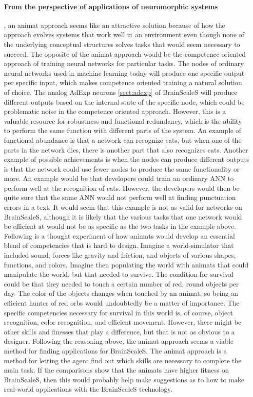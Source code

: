 \paragraph{From the perspective of applications of neuromorphic systems}, an animat approach seems like an attractive solution because of how the approach evolves systems that work well in an environment even though none of the underlying conceptual structures solves tasks that would seem necessary to succeed.
The opposite of the animat approach would be the competence oriented approach of training neural networks for particular tasks.
The nodes of ordinary neural networks used in machine learning today will produce one specific output per specific input, which makes competence oriented training a natural solution of choice.
The analog AdExp neurons \vref{sect:adexp} of BrainScaleS will produce different outputs based on the internal state of the specific node, which could be problematic noise in the competence oriented approach. However, this is a valuable resource for robustness and functional redundancy, which is the ability to perform the same function with different parts of the system.
An example of functional abundance is that a network can recognize cats, but when one of the parts in the network dies, there is another part that also recognizes cats.
Another example of possible achievements is when the nodes can produce different outputs is that the network could use fewer nodes to produce the same functionality or more.
An example would be that developers could train an ordinary ANN to perform well at the recognition of cats. However, the developers would then be quite sure that the same ANN would not perform well at finding punctuation errors in a text.
It would seem that this example is not as valid for networks on BrainScaleS, although it is likely that the various tasks that one network would be efficient at would not be as specific as the two tasks in the example above.
Following is a thought experiment of how animats would develop an essential blend of competencies that is hard to design.
Imagine a world-simulator that included sound, forces like gravity and friction, and objects of various shapes, functions, and colors.
Imagine then populating the world with animats that could manipulate the world, but that needed to survive.
The condition for survival could be that they needed to touch a certain number of red, round objects per day.
The color of the objects changes when touched by an animat, so being an efficient hunter of red orbs would undoubtedly be a matter of importance.
The specific competencies necessary for survival in this world is, of course, object recognition, color recognition, and efficient movement.
However, there might be other skills and finesses that play a difference, but that is not as obvious to a designer.
Following the reasoning above, the animat approach seems a viable method for finding applications for BrainScaleS.
The animat approach is a method for letting the agent find out which skills are necessary to complete the main task.
If the comparisons show that the animats have higher fitness on BrainScaleS, then this would probably help make suggestions as to how to make real-world applications with the BrainScaleS technology.

